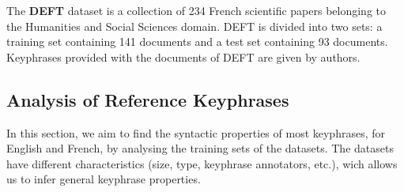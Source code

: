     The \textbf{DEFT} dataset \cite{Paroubek2012deft} is a collection of 234
    French scientific papers belonging to the Humanities and Social Sciences
    domain. DEFT is divided into two sets: a training set containing 141
    documents and a test set containing 93 documents. Keyphrases provided with
    the documents of DEFT are given by authors.

  \subsection{Analysis of Reference Keyphrases}
  \label{subsec:keyphrase_analysis}
    In this section, we aim to find the syntactic properties of most keyphrases,
    for English and French, by analysing the training sets of the datasets. The
    datasets have different characteristics (size, type, keyphrase annotators,
    etc.), wich allows us to infer general keyphrase properties.

